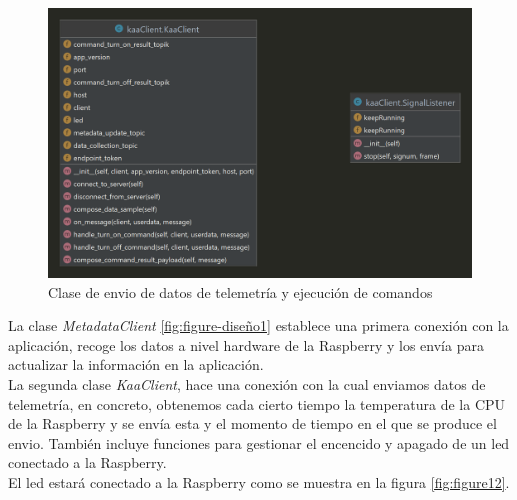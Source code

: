 {\begin{figure}[p]
    \centering
    \includegraphics[width=\linewidth]{imagenes/kaaClient.png}
    \caption{Clase de envio de datos de telemetría y ejecución de comandos}
    \label{fig:figure-diseño2}
\end{figure}

La clase \textit{MetadataClient} \ref{fig:figure-diseño1} establece una primera conexión con la aplicación, recoge los datos a nivel hardware de la Raspberry y los envía para actualizar la información en la aplicación. \\

La segunda clase \textit{KaaClient}, hace una conexión con la cual enviamos datos de telemetría, en concreto, obtenemos cada cierto tiempo la temperatura de la CPU de la Raspberry y se envía esta y el momento de tiempo en el que se produce el envio. También incluye funciones para gestionar el encencido y apagado de un led conectado a la Raspberry. \\

El led estará conectado a la Raspberry como se muestra en la figura \ref{fig:figure12}.

}
